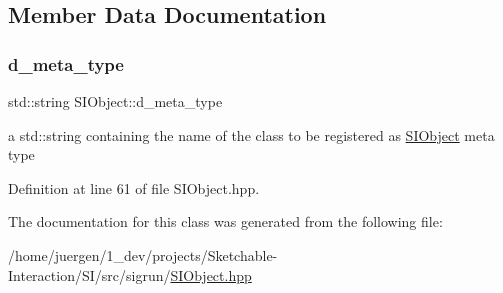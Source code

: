 \subsection{Member Data Documentation}
\mbox{\label{class_s_i_object_ad7e84d405cf54a7d13a37bfaa61f5d98}} 
\subsubsection{\texorpdfstring{d\_meta\_type}{d\_meta\_type}}
{\footnotesize\ttfamily std\+::string S\+I\+Object\+::d\+\_\+meta\+\_\+type\hspace{0.3cm}{\ttfamily [protected]}}



a std\+::string containing the name of the class to be registered as \mbox{\hyperlink{class_s_i_object}{S\+I\+Object}} meta type 



Definition at line 61 of file S\+I\+Object.\+hpp.



The documentation for this class was generated from the following file\+:\begin{DoxyCompactItemize}
\item 
/home/juergen/1\+\_\+dev/projects/\+Sketchable-\/\+Interaction/\+S\+I/src/sigrun/\mbox{\hyperlink{_s_i_object_8hpp}{S\+I\+Object.\+hpp}}\end{DoxyCompactItemize}

